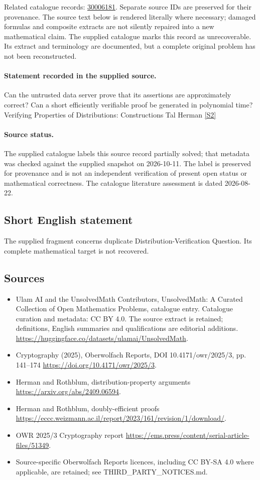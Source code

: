 \documentclass[11pt]{article}
\begin{document}
Related catalogue records: \href{https://mehmetmars7.github.io/Erdosproblems-llm-hunter/problem.html?type=open_problems&id=30006181}{30006181}. Separate source IDs are preserved for their provenance.
The source text below is rendered literally where necessary; damaged formulas and composite extracts are not silently repaired into a new mathematical claim.
The supplied catalogue marks this record as unrecoverable. Its extract and terminology are documented, but a complete original problem has not been reconstructed.
\paragraph{Statement recorded in the supplied source.}
Can the untrusted data server prove that its assertions are approximately correct? Can a short efficiently verifiable proof be generated in polynomial time? Verifying Properties of Distributions: Constructions Tal Herman \href{https://doi.org/10.4171/owr/2025/3}{[S2]}
\paragraph{Source status.}
The supplied catalogue labels this source record partially solved; that metadata was checked against the supplied snapshot on 2026-10-11. The label is preserved for provenance and is not an independent verification of present open status or mathematical correctness. The catalogue literature assessment is dated 2026-08-22.
\subsection{Short English statement}
The supplied fragment concerns duplicate Distribution-Verification Question. Its complete mathematical target is not recovered.
\subsection{Sources}
\begin{itemize}
\item[S1] Ulam AI and the UnsolvedMath Contributors, UnsolvedMath: A Curated Collection of Open Mathematics Problems, catalogue entry. Catalogue curation and metadata: CC BY 4.0. The source extract is retained; definitions, English summaries and qualifications are editorial additions.
\url{https://huggingface.co/datasets/ulamai/UnsolvedMath}.
\item[S2] Cryptography (2025), Oberwolfach Reports, DOI 10.4171/owr/2025/3, pp. 141--174
\url{https://doi.org/10.4171/owr/2025/3}.
\item[S3] Herman and Rothblum, distribution-property arguments
\url{https://arxiv.org/abs/2409.06594}.
\item[S4] Herman and Rothblum, doubly-efficient proofs
\url{https://eccc.weizmann.ac.il/report/2023/161/revision/1/download/}.
\item[S5] OWR 2025/3 Cryptography report
\url{https://ems.press/content/serial-article-files/51349}.
\item Source-specific Oberwolfach Reports licences, including CC BY-SA 4.0 where applicable, are retained; see THIRD\_PARTY\_NOTICES.md.
\end{itemize}
\end{document}
